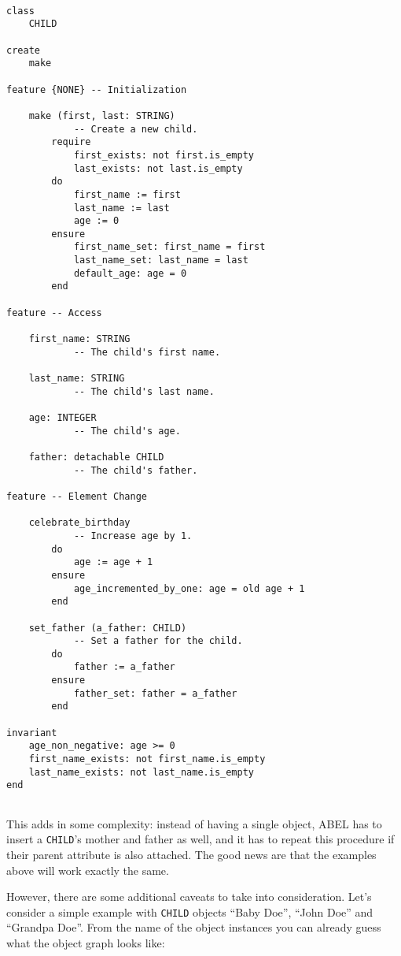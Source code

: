 \documentclass[a4paper,12pt]{report}
\begin{document}
\begin{lstlisting}[language=OOSC2Eiffel, captionpos=b, caption={The CHILD class.}, label={lst:child_class}]

class
	CHILD

create
	make

feature {NONE} -- Initialization

	make (first, last: STRING)
			-- Create a new child.
		require
			first_exists: not first.is_empty
			last_exists: not last.is_empty
		do
			first_name := first
			last_name := last
			age := 0
		ensure
			first_name_set: first_name = first
			last_name_set: last_name = last
			default_age: age = 0
		end

feature -- Access

	first_name: STRING
			-- The child's first name.

	last_name: STRING
			-- The child's last name.

	age: INTEGER
			-- The child's age.

	father: detachable CHILD
			-- The child's father.

feature -- Element Change

	celebrate_birthday
			-- Increase age by 1.
		do
			age := age + 1
		ensure
			age_incremented_by_one: age = old age + 1
		end

	set_father (a_father: CHILD)
			-- Set a father for the child.
		do
			father := a_father
		ensure
			father_set: father = a_father
		end

invariant
	age_non_negative: age >= 0
	first_name_exists: not first_name.is_empty
	last_name_exists: not last_name.is_empty
end


\end{lstlisting}


This adds in some complexity: 
instead of having a single object, ABEL has to insert a \lstinline!CHILD!'s mother and father as well, and it has to repeat this procedure if their parent attribute is also attached. 
The good news are that the examples above will work exactly the same.

However, there are some additional caveats to take into consideration. 
Let's consider a simple example with \lstinline!CHILD! objects ``Baby Doe'', ``John Doe'' and ``Grandpa Doe''.
From the name of the object instances you can already guess what the object graph looks like: 

	\begin{center}
	\end{center}
\end{document}
